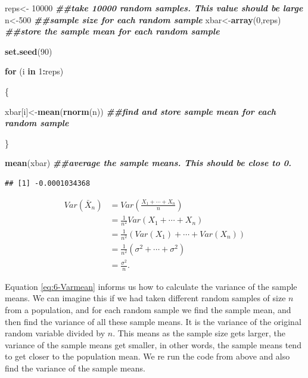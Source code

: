 \documentclass[
]{book}
\newenvironment{Shaded}{\begin{snugshade}}{\end{snugshade}}
\newcommand{\ControlFlowTok}[1]{\textcolor[rgb]{0.13,0.29,0.53}{\textbf{#1}}}
\newcommand{\DecValTok}[1]{\textcolor[rgb]{0.00,0.00,0.81}{#1}}
\newcommand{\DocumentationTok}[1]{\textcolor[rgb]{0.56,0.35,0.01}{\textbf{\textit{#1}}}}
\newcommand{\FunctionTok}[1]{\textcolor[rgb]{0.13,0.29,0.53}{\textbf{#1}}}
\newcommand{\NormalTok}[1]{#1}
\newcommand{\OtherTok}[1]{\textcolor[rgb]{0.56,0.35,0.01}{#1}}
\newcommand{\SpecialCharTok}[1]{\textcolor[rgb]{0.81,0.36,0.00}{\textbf{#1}}}
\begin{document}
\begin{Shaded}
\begin{Highlighting}[]
\NormalTok{reps}\OtherTok{\textless{}{-}} \DecValTok{10000} \DocumentationTok{\#\#take 10000 random samples. This value should be large}
\NormalTok{n}\OtherTok{\textless{}{-}}\DecValTok{500} \DocumentationTok{\#\#sample size for each random sample}
\NormalTok{xbar}\OtherTok{\textless{}{-}}\FunctionTok{array}\NormalTok{(}\DecValTok{0}\NormalTok{,reps) }\DocumentationTok{\#\#store the sample mean for each random sample}

\FunctionTok{set.seed}\NormalTok{(}\DecValTok{90}\NormalTok{)}

\ControlFlowTok{for}\NormalTok{ (i }\ControlFlowTok{in} \DecValTok{1}\SpecialCharTok{:}\NormalTok{reps)}
  
\NormalTok{\{}
  
\NormalTok{  xbar[i]}\OtherTok{\textless{}{-}}\FunctionTok{mean}\NormalTok{(}\FunctionTok{rnorm}\NormalTok{(n)) }\DocumentationTok{\#\#find and store sample mean for each random sample}
  
\NormalTok{\}}

\FunctionTok{mean}\NormalTok{(xbar) }\DocumentationTok{\#\#average the sample means. This should be close to 0. }
\end{Highlighting}
\end{Shaded}

\begin{verbatim}
## [1] -0.0001034368
\end{verbatim}

\begin{equation} 
\begin{split}
Var(\bar{X}_n) &= Var(\frac{X_1 + \cdots + X_n}{n}) \\
             &= \frac{1}{n^2}Var(X_1 + \cdots + X_n) \\
             &= \frac{1}{n^2} (Var(X_1) + \cdots + Var(X_n)) \\
             &= \frac{1}{n^2} (\sigma^2 + \cdots + \sigma^2) \\
             &= \frac{\sigma^2}{n}.
\end{split}
\label{eq:6-Varmean}
\end{equation}

Equation \eqref{eq:6-Varmean} informs us how to calculate the variance of the sample means. We can imagine this if we had taken different random samples of size \(n\) from a population, and for each random sample we find the sample mean, and then find the variance of all these sample means. It is the variance of the original random variable divided by \(n\). This means as the sample size gets larger, the variance of the sample means get smaller, in other words, the sample means tend to get closer to the population mean. We re run the code from above and also find the variance of the sample means.
\end{document}
